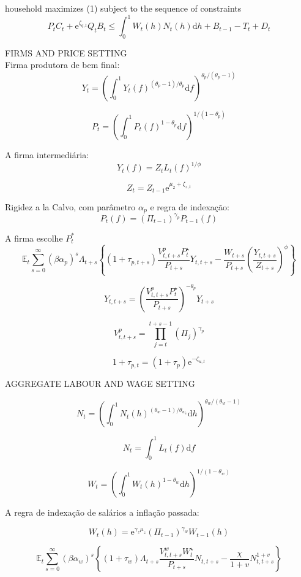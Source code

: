  household maximizes (1) subject to the sequence of constraints
\[
P_{t} C_{t}+\mathrm{e}^{\zeta_{q, t}} Q_{t} B_{t} \leq \int_{0}^{1} W_{t}(h) N_{t}(h) \mathrm{d} h+B_{t-1}-T_{t}+D_{t}
\]

FIRMS AND PRICE SETTING\\

Firma produtora de bem final:
\[
Y_{t}=\left(\int_{0}^{1} Y_{t}(f)^{\left(\theta_{p}-1\right) / \theta_{p}} \mathrm{d} f\right)^{\theta_{p} /\left(\theta_{p}-1\right)}
\]

\[
P_{t}=\left(\int_{0}^{1} P_{t}(f)^{1-\theta_{p}} \mathrm{d} f\right)^{1 /\left(1-\theta_{p}\right)}
\]

A firma intermediária:
\[
Y_{t}(f)=Z_{t} L_{t}(f)^{1 / \phi}
\]

\[
Z_{t}=Z_{t-1} \mathrm{e}^{\mu_{2}+\zeta_{z, t}}
\]

Rigidez a la Calvo, com parâmetro $\alpha_p$ e regra de indexação:
$$P_t(f) = (\Pi_{t-1})^{\gamma_p}P_{t-1}(f) $$

A firma escolhe $P_t^{*}$
\[
\mathbb{E}_{t} \sum_{s=0}^{\infty}\left(\beta \alpha_{p}\right)^{s} \Lambda_{t+s}\left\{\left(1+\tau_{p, t+s}\right) \frac{V_{t, t+s}^{p} P_{t}^{\star}}{P_{t+s}} Y_{t, t+s}-\frac{W_{t+s}}{P_{t+s}}\left(\frac{Y_{t, t+s}}{Z_{t+s}}\right)^{\phi}\right\}
\]

\[
Y_{t, t+s}=\left(\frac{V_{t, t+s}^{p} P_{t}^{\star}}{P_{t+s}}\right)^{-\theta_{p}} Y_{t+s}
\]

\[
V_{t, t+s}^{p}=\prod_{j=t}^{t+s-1}\left(\Pi_{j}\right)^{\gamma_{p}}
\]

\[
1+\tau_{p, t}=\left(1+\tau_{p}\right) \mathrm{e}^{-\zeta_{u, t}}
\]


AGGREGATE LABOUR AND WAGE SETTING

\[
N_{t}=\left(\int_{0}^{1} N_{t}(h)^{\left(\theta_{w}-1\right) / \theta_{w_{v}}} \mathrm{d} h\right)^{\theta_{w} /\left(\theta_{w}-1\right)}
\]

\[
N_{t}=\int_{0}^{1} L_{t}(f) \mathrm{d} f
\]

\[
W_{t}=\left(\int_{0}^{1} W_{t}(h)^{1-\theta_{w}} \mathrm{d} h\right)^{1 /\left(1-\theta_{w}\right)}
\]

A regra de indexação de salários a inflação passada:

\[
W_{t}(h)=\mathrm{e}^{\gamma_{z} \mu_{z}}\left(\Pi_{t-1}\right)^{\gamma_{w}} W_{t-1}(h)
\]

\[
\mathbb{E}_{t} \sum_{s=0}^{\infty}\left(\beta \alpha_{w}\right)^{s}\left\{\left(1+\tau_{w}\right) \Lambda_{t+s} \frac{V_{t, t+s}^{w} W_{t}^{\star}}{P_{t+s}} N_{t, t+s}-\frac{\chi}{1+v} N_{t, t+s}^{1+v}\right\}
\]

